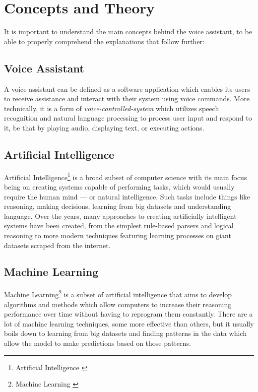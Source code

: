 \cleardoubleemptypage
\renewcommand*\chapterpagestyle{scrheadings}

\chapter{Concepts and Theory}
It is important to understand the main concepts behind the voice assistant,
to be able to properly comprehend the explanations that follow further:

\section{Voice Assistant}
A voice assistant can be defined as a software application
which enables its users to receive assistance and interact with their system
using voice commands. More technically, it is a form of \textit{voice-controlled-system} which utilizes speech recognition and
natural language processing to process user input and respond to it,
be that by playing audio, displaying text, or executing actions.

\section{Artificial Intelligence}
Artificial Intelligence\footnote{Artificial Intelligence \cite{ai}} is a broad subset of computer science
with its main focus being on creating systems capable of performing tasks,
which would usually require the human mind --- or natural intelligence.
Such tasks include things like reasoning, making decisions, learning from big datasets and understanding language.
Over the years, many approaches to creating artificially intelligent systems have been created,
from the simplest rule-based parsers and logical reasoning to more modern techniques
featuring learning processes on giant datasets scraped from the internet.

\section{Machine Learning}
Machine Learning\footnote{Machine Learning \cite{ml}} is a subset of artificial intelligence  
that aims to develop algorithms and methods which allow computers to increase
their reasoning performance over time without having to reprogram them constantly.
There are a lot of machine learning techniques, some more effective than others,
but it usually boils down to learning from big datasets and finding
patterns in the data which allow the model to make predictions based on those patterns.

